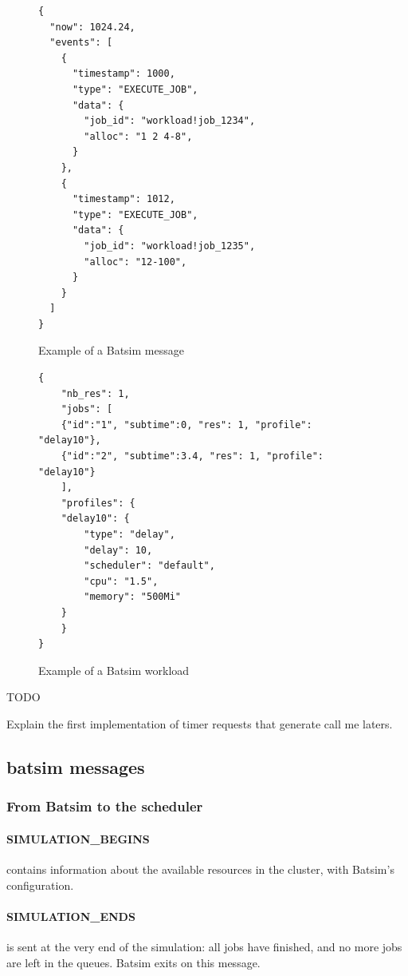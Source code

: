 \begin{figure}
	\begin{verbatim}
{
  "now": 1024.24,
  "events": [
    {
      "timestamp": 1000,
      "type": "EXECUTE_JOB",
      "data": {
        "job_id": "workload!job_1234",
        "alloc": "1 2 4-8",
      }
    },
    {
      "timestamp": 1012,
      "type": "EXECUTE_JOB",
      "data": {
        "job_id": "workload!job_1235",
        "alloc": "12-100",
      }
    }
  ]
}
\end{verbatim}
\caption{Example of a Batsim message}
\label{fig:batmsg_ex}
\end{figure}


\begin{figure}
	\begin{verbatim}
{
    "nb_res": 1,
    "jobs": [
	{"id":"1", "subtime":0, "res": 1, "profile": "delay10"},
	{"id":"2", "subtime":3.4, "res": 1, "profile": "delay10"}
    ],
    "profiles": {
	"delay10": {
	    "type": "delay",
	    "delay": 10,
	    "scheduler": "default",
	    "cpu": "1.5",
	    "memory": "500Mi"
	}
    }
}
	\end{verbatim}
	\caption{Example of a Batsim workload}
	\label{fig:bat_wl_ex}
\end{figure}

TODO

Explain the first implementation of timer requests that generate call me laters.

\subsection{batsim messages} \label{sec:batmsg}

\subsubsection{From Batsim to the scheduler}

\paragraph{SIMULATION\_BEGINS}
contains information about the available resources in the cluster, with
Batsim's configuration.

\paragraph{SIMULATION\_ENDS}
is sent at the very end of the simulation: all jobs have finished, and no more
jobs are left in the queues. Batsim exits on this message.

